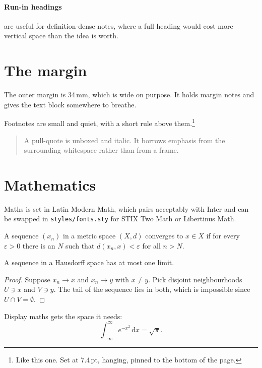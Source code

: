 \paragraph{Run-in headings} are useful for definition-dense notes, where a
full heading would cost more vertical space than the idea is worth.

\section{The margin}

The outer margin is 34\,mm, which is wide on purpose. It holds margin notes and gives the text block somewhere to
breathe.

\divider

Footnotes are small and quiet, with a short rule above them.\footnote{Like
this one. Set at 7.4\,pt, hanging, pinned to the bottom of the page.}

\begin{quotation}
A pull-quote is unboxed and italic. It borrows emphasis from the surrounding
whitespace rather than from a frame.
\end{quotation}

\section{Mathematics}

Maths is set in Latin Modern Math, which pairs acceptably with Inter and can
be swapped in \texttt{styles/fonts.sty} for STIX Two Math or Libertinus Math.

\begin{definition}[Convergence]
A sequence $(x_n)$ in a metric space $(X, d)$ converges to $x \in X$ if for
every $\varepsilon > 0$ there is an $N$ such that $d(x_n, x) < \varepsilon$
for all $n > N$.
\end{definition}

\begin{theorem}
A sequence in a Hausdorff space has at most one limit.
\end{theorem}

\begin{proof}
Suppose $x_n \to x$ and $x_n \to y$ with $x \neq y$. Pick disjoint
neighbourhoods $U \ni x$ and $V \ni y$. The tail of the sequence lies in both,
which is impossible since $U \cap V = \emptyset$.
\end{proof}

Display maths gets the space it needs:
\[
  \int_{-\infty}^{\infty} e^{-x^2}\,\mathrm{d}x = \sqrt{\pi}.
\]
